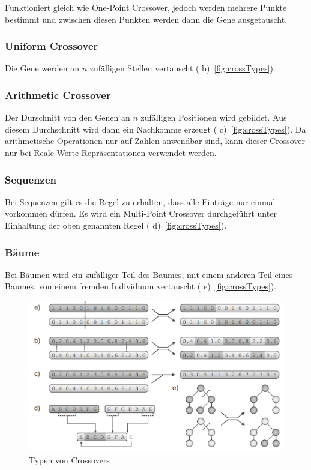           Funktioniert gleich wie One-Point Crossover, jedoch werden mehrere Punkte bestimmt und
          zwischen diesen Punkten werden dann die Gene ausgetauscht.

        \subsubsection{Uniform Crossover}

          Die Gene werden an \(n\) zufälligen Stellen vertauscht ( b)~\vref{fig:crossTypes}).

        \subsubsection{Arithmetic Crossover}

          Der Durschnitt von den Genen an \(n\) zufälligen Positionen wird gebildet.
          Aus diesem Durchschnitt wird dann ein Nachkomme erzeugt ( c)~\vref{fig:crossTypes}).
          Da arithmetische Operationen nur auf Zahlen anwendbar sind,
          kann dieser Crossover nur bei Reale-Werte-Repräsentationen verwendet werden.

        \subsubsection{Sequenzen}

          Bei Sequenzen gilt es die Regel zu erhalten, dass alle Einträge nur einmal vorkommen dürfen.
          Es wird ein Multi-Point Crossover durchgeführt unter Einhaltung der oben genannten Regel ( d)~\vref{fig:crossTypes}).

        \subsubsection{Bäume}

        Bei Bäumen wird ein zufälliger Teil des Baumes, mit einem anderen Teil eines Baumes, von einem fremden Individuum vertauscht ( e)~\vref{fig:crossTypes}).

        \begin{figure}[H]
          \includegraphics[scale=0.7, center]{graphics/crossover_types}
          \caption{Typen von Crossovers~\cite[S.27]{book:bioInspired}\label{fig:crossTypes}}
        \end{figure}


